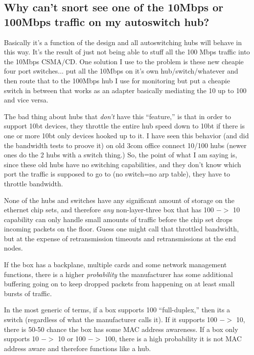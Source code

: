 \documentclass{article}
\begin{document}
\subsection{Why can't snort see one of the 10Mbps or 100Mbps traffic on my autoswitch hub?}

Basically it's a function of the design and all autoswitching hubs will 
behave in this way.  It's the result of just not being able to stuff all 
the 100 Mbps traffic into the 10Mbps CSMA/CD.  One solution I use to the 
problem is these new cheapie four port switches... put all the 10Mbps on 
it's own hub/switch/whatever and then route that to the 100Mbps hub I use 
for monitoring but put a cheapie switch in between that works as an 
adapter basically mediating the 10 up to 100 and vice versa.


The bad thing about hubs that {\em don't} have this ``feature,'' is that
in order to support 10bt devices, they throttle the entire hub speed
down to 10bt if there is one or more 10bt only devices hooked up to it.
I have seen this behavior (and did the bandwidth tests to proove it) on
old 3com office connect 10/100 hubs (newer ones do the 2 hubs with a switch
thing.)  So, the point of what I am saying is, since these old hubs have
no switching capabilities, and they don't know which port the traffic is
supposed to go to (no switch=no arp table), they have to throttle bandwidth.

None of the hubs and switches have any significant amount of storage
on the ethernet chip sets, and therefore {\em any} non-layer-three box that
has 100 $->$ 10 capability can only handle small amounts of traffic before
the chip set drops incoming packets on the floor. Guess one might call
that throttled bandwidth, but at the expense of retransmission timeouts
and retransmissions at the end nodes.

If the box has a backplane, multiple cards and some network management
functions, there is a higher {\em probability} the manufacturer has some
additional buffering going on to keep dropped packets from happening
on at least small bursts of traffic.

In the most generic of terms, if a box supports 100 ``full-duplex,'' then
its a switch (regardless of what the manufacturer calls it). If it
supports 100 $->$ 10, there is 50-50 chance the box has some MAC address
awareness. If a box only supports 10 $->$ 10 or 100 $->$ 100, there is a
high probability it is not MAC address aware and therefore functions
like a hub.
\end{document}
